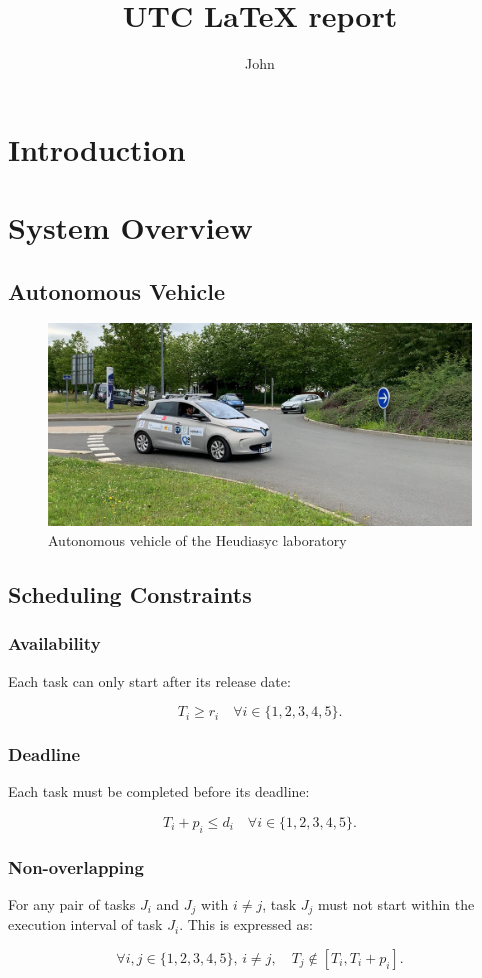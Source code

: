 \documentclass{utc-report/utc-report}
\title{UTC LaTeX report}
\author{John \sc{DOE}}
\begin{document}
\maketitlepage

\tableofcontents{}

\pagebreak

\section{Introduction}
\lipsum[1]

\section{System Overview}

\subsection{Autonomous Vehicle}

\begin{figure}[h]
    \centering
    \includegraphics[width=0.7\linewidth]{img/zoe_hds.jpg}
    \caption{Autonomous vehicle of the Heudiasyc laboratory}
\end{figure}

\lipsum[2]

\pagebreak

\subsection{Scheduling Constraints}

\subsubsection*{Availability}

Each task can only start after its release date:

\[
    T_i \geq r_i \quad \forall i \in \{1, 2, 3, 4, 5\}.
\]

\subsubsection*{Deadline}

Each task must be completed before its deadline:

\[
    T_i + p_i \leq d_i \quad \forall i \in \{1, 2, 3, 4, 5\}.
\]

\subsubsection*{Non-overlapping}

For any pair of tasks \( J_i \) and \( J_j \) with \( i \neq j \), task \( J_j \) must not start within the execution interval of task \( J_i \). This is expressed as:

\[
    \forall i, j \in \{1, 2, 3, 4, 5\}, \, i \neq j, \quad T_j \notin [T_i, T_i + p_i].
\]
\end{document}
